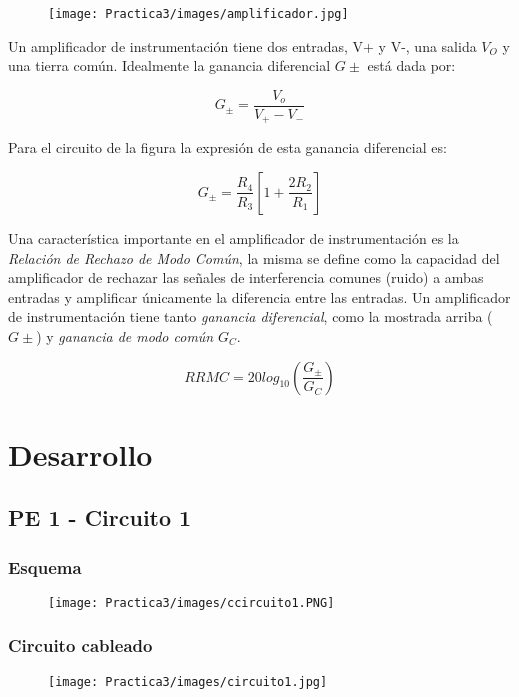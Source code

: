 \documentclass[12pt]{article}
\begin{document}
    	\begin{figure}[h!]
                \centering
                \texttt{[image: Practica3/images/amplificador.jpg]}
    \end{figure} 
    
    Un amplificador de instrumentación tiene dos entradas, V+ y V-, una salida $V_{O}$ y una tierra común. Idealmente la ganancia diferencial $G\pm$ está dada por:
    
    $$G_{\pm} = \frac{V_{o}}{V_{+} - V_{-}}$$
    
    Para el circuito de la figura  la expresión de esta ganancia diferencial es:
    
    $$G_{\pm} = \frac{R_{4}}{R_{3}}\left[1 + \frac{2R_{2}}{R_{1}}\right]$$
    
    Una característica importante en el amplificador de instrumentación es la \textit{Relación de Rechazo de Modo Común},  la misma se define como la capacidad del amplificador de rechazar las señales de interferencia comunes (ruido) a ambas entradas y amplificar únicamente la diferencia entre las entradas. Un amplificador de instrumentación tiene tanto \textit{ganancia diferencial}, como la mostrada arriba ($G\pm$) y \textit{ganancia de modo común} $G_{C}$.
    
    $$ RRMC = 20log_{10}\left(\frac{G_{\pm}}{G_{C}}\right)$$


    \newpage
	\section{Desarrollo}
	\subsection{PE 1 - Circuito 1}
	\subsubsection{Esquema}
	\begin{figure}[h!]
                \centering
                \texttt{[image: Practica3/images/ccircuito1.PNG]}
    \end{figure} 
    
	\subsubsection{Circuito cableado}
		\begin{figure}[h!]
                \centering
                \texttt{[image: Practica3/images/circuito1.jpg]}
    \end{figure} 
\end{document}
